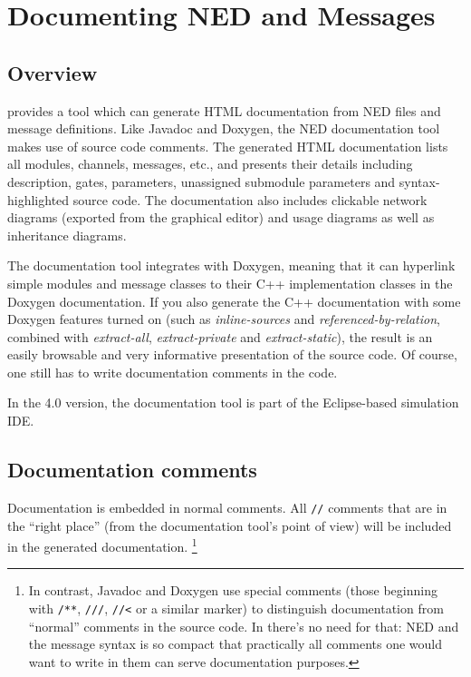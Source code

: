 \chapter{Documenting NED and Messages}
\label{cha:neddoc}

\section{Overview}

{\opp} provides a tool which can generate HTML documentation from NED files
and message definitions. Like Javadoc and Doxygen, the NED documentation tool
makes use of source code comments. The generated HTML documentation
lists all modules, channels, messages, etc., and presents their details including
description, gates, parameters, unassigned submodule parameters and
syntax-highlighted source code. The documentation also includes clickable
network diagrams (exported from the graphical editor) and usage diagrams as
well as inheritance diagrams.

The documentation tool integrates with Doxygen, meaning that it can
hyperlink simple modules and message classes to their C++ implementation
classes in the Doxygen documentation. If you also generate the C++
documentation with some Doxygen features turned on (such as
\textit{inline-sources} and \textit{referenced-by-relation}, combined with
\textit{extract-all}, \textit{extract-private} and
\textit{extract-static}), the result is an easily browsable and very
informative presentation of the source code. Of course, one still has to
write documentation comments in the code.

In the 4.0 version, the documentation tool is part of the Eclipse-based
simulation IDE.


\section{Documentation comments}

Documentation is embedded in normal comments. All \texttt{//} comments
that are in the ``right place'' (from the documentation tool's
point of view) will be included in the generated documentation.
  \footnote{In contrast, Javadoc and Doxygen use special comments (those
     beginning with \texttt{/**}, \texttt{///}, \texttt{//<} or a similar
     marker) to distinguish documentation from ``normal'' comments in the
     source code. In {\opp} there's no need for that: NED and the message
     syntax is so compact that practically all comments one would want to write
     in them can serve documentation purposes.}


